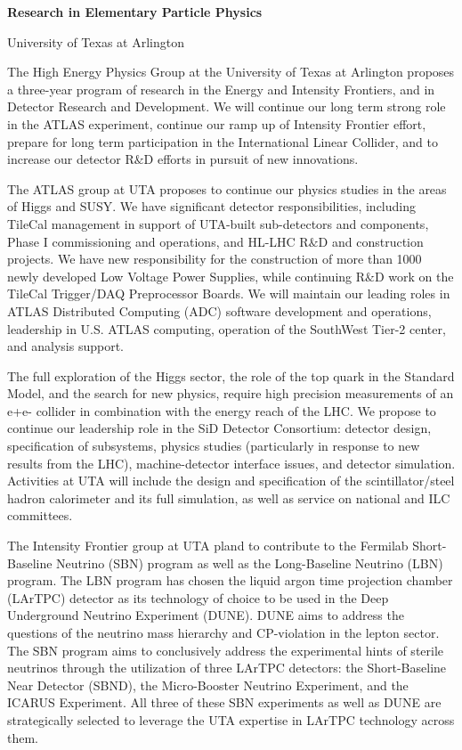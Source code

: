 
\begin{center}
\Large\textbf{Research in Elementary Particle Physics}

University of Texas at Arlington
\end{center}

The High Energy Physics Group at the University of Texas at Arlington proposes a three-year program of research in the Energy and Intensity Frontiers, and in Detector Research and Development. We will continue our long term strong role in the ATLAS experiment, continue our ramp up of Intensity Frontier effort, prepare for long term participation in the International Linear Collider, and to increase our detector R$\&$D efforts in pursuit of new innovations.

The ATLAS group at UTA proposes to continue our physics studies in the areas of Higgs and SUSY. We have significant detector responsibilities, including TileCal management in support of UTA-built sub-detectors and components, Phase I commissioning and operations, and HL-LHC R$\&$D and construction projects. We have new responsibility for the construction of more than 1000 newly developed Low Voltage Power Supplies, while continuing R$\&$D work on the TileCal Trigger/DAQ Preprocessor Boards. We will maintain our leading roles in ATLAS Distributed Computing (ADC) software development and operations, leadership in U.S. ATLAS computing, operation of the SouthWest Tier-2 center, and analysis support. 

The full exploration of the Higgs sector, the role of the top quark in the Standard Model, and the search for new physics, require high precision measurements of an e+e- collider in combination with the energy reach of the LHC. We propose to continue our leadership role in the SiD Detector Consortium: detector design, specification of subsystems, physics studies (particularly in response to new results from the LHC), machine-detector interface issues, and detector simulation. Activities at UTA will include the design and specification of the scintillator/steel hadron calorimeter and its full simulation, as well as service on national and ILC committees.

The Intensity Frontier group at UTA pland to contribute to the Fermilab Short-Baseline Neutrino (SBN) program as well as the Long-Baseline Neutrino (LBN) program. The LBN program has chosen the liquid argon time projection chamber (LArTPC) detector as its technology of choice to be used in the Deep Underground Neutrino Experiment (DUNE).  DUNE aims to address the questions of the neutrino mass hierarchy and CP-violation in the lepton sector. The SBN program aims to conclusively address the experimental hints of sterile neutrinos through the utilization of three LArTPC detectors: the Short-Baseline Near Detector (SBND), the Micro-Booster Neutrino Experiment, and the ICARUS Experiment. All three of these SBN experiments as well as DUNE are strategically selected to leverage the UTA expertise in LArTPC technology across them.

